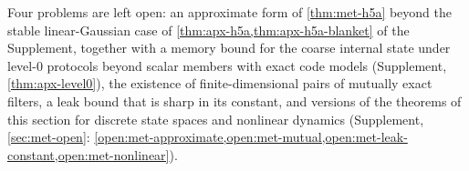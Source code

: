 Four problems are left open: an approximate form of \cref{thm:met-h5a} beyond the stable linear-Gaussian case of \cref{thm:apx-h5a,thm:apx-h5a-blanket} of the Supplement, together with a memory bound for the coarse internal state under level-0 protocols beyond scalar members with exact code models (Supplement, \cref{thm:apx-level0}), the existence of finite-dimensional pairs of mutually exact filters, a leak bound that is sharp in its constant, and versions of the theorems of this section for discrete state spaces and nonlinear dynamics (Supplement, \cref{sec:met-open}: \cref{open:met-approximate,open:met-mutual,open:met-leak-constant,open:met-nonlinear}).
